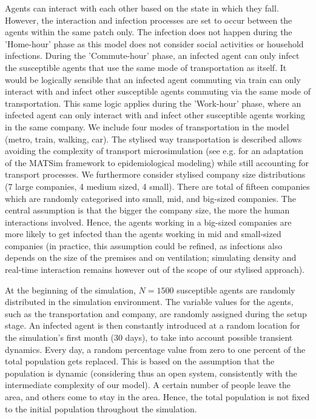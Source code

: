\documentclass[smallextended]{svjour3}       %
\begin{document}
Agents can interact with each other based on the state in which they fall. However, the interaction and infection processes are set to occur between the agents within the same patch only. The infection does not happen during the 'Home-hour' phase as this model does not consider social activities or household infections. During the 'Commute-hour' phase, an infected agent can only infect the susceptible agents that use the same mode of transportation as itself. It would be logically sensible that an infected agent commuting via train can only interact with and infect other susceptible agents commuting via the same mode of transportation. This same logic applies during the 'Work-hour' phase, where an infected agent can only interact with and infect other susceptible agents working in the same company. We include four modes of transportation in the model (metro, train, walking, car). The stylised way transportation is described allows avoiding the complexity of transport microsimulation (see e.g. \cite{axhausen2021modelling} for an adaptation of the MATSim framework to epidemiological modeling) while still accounting for transport processes. We furthermore consider stylised company size distributions (7 large companies, 4 medium sized, 4 small). There are total of fifteen companies which are randomly categorised into small, mid, and big-sized companies. The central assumption is that the bigger the company size, the more the human interactions involved. Hence, the agents working in a big-sized companies are more likely to get infected than the agents working in mid and small-sized companies (in practice, this assumption could be refined, as infections also depends on the size of the premises and on ventilation; simulating density and real-time interaction remains however out of the scope of our stylised approach).


At the beginning of the simulation, $N = 1500$ susceptible agents are randomly distributed in the simulation environment. The variable values for the agents, such as the transportation and company, are randomly assigned during the setup stage. An infected agent is then constantly introduced at a random location for the simulation's first month (30 days), to take into account possible transient dynamics. Every day, a random percentage value from zero to one percent of the total population gets replaced. This is based on the assumption that the population is dynamic (considering thus an open system, consistently with the intermediate complexity of our model). A certain number of people leave the area, and others come to stay in the area. Hence, the total population is not fixed to the initial population throughout the simulation.
\end{document}
